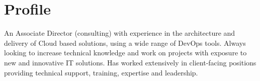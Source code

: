 \section{Profile}

An Associate Director (consulting) with experience in the architecture 
and delivery of Cloud based solutions, using a wide 
range of DevOps tools. Always looking to increase technical 
knowledge and work on projects with exposure to new and innovative 
IT solutions. Has worked extensively in client-facing positions 
providing technical support, training, expertise and leadership.

\closesection{}
